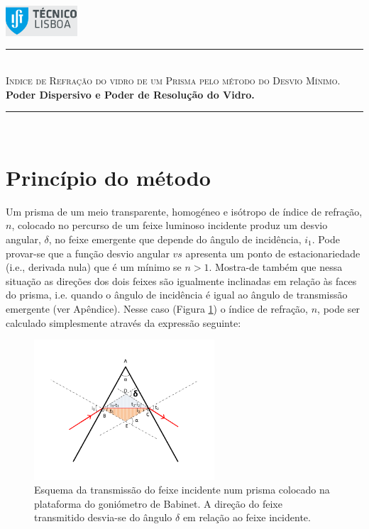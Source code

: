 \documentclass[a4paper,12pt]{article}  %
\author{Prof. Bernardo B. Carvalho}
\date{ Outubro 2012}
\newcommand{\HRule}{\rule{\linewidth}{0.5mm}}
\begin{document}
 

	\includegraphics[width=0.2\textwidth]{../logo-ist}%

	\HRule \\[0.5cm]
	{ \huge \sf  \textsc{Indice de Refração do vidro de um Prisma pelo método  do Desvio Mínimo.}} \\[0.4cm] %
	{ \large \bfseries Poder Dispersivo e Poder de Resolução do Vidro.}\\
	\HRule \\%

\section{\sf Princípio do método}
Um prisma de um meio transparente, homogéneo e isótropo de índice de refração, $n$, colocado no percurso de um feixe luminoso incidente produz um desvio angular, $\delta$, no feixe emergente que depende do ângulo de incidência, $i_1$. Pode provar-se que a função desvio angular $vs$ apresenta um ponto de estacionariedade (i.e., derivada nula) que é um mínimo se $n > 1$. 
Mostra-de também que nessa situação as direções dos dois feixes são igualmente inclinadas em relação às faces do prisma, i.e. quando o ângulo de incidência é igual ao ângulo de transmissão 
emergente (ver Apêndice). 
Nesse caso  (Figura \ref{fig:desvio}) o índice de refração, $n$, pode ser calculado simplesmente através da expressão seguinte: 

\begin{figure}[hb]  \centering 
	\includegraphics[width=0.6\textwidth]{desvio}
	\caption{Esquema da transmissão do feixe incidente num prisma colocado na plataforma do goniómetro de Babinet. A direção do feixe transmitido desvia-se do ângulo $\delta$ em relação ao feixe incidente. \label{fig:desvio}} 
\end{figure}
\end{document}
